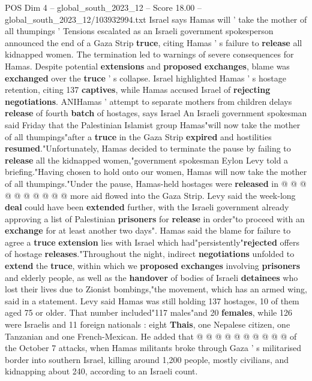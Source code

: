 \begin{textsample}{POS Dim 4 – global\_south\_2023\_12 – Score 18.00 – global\_south\_2023\_12/103932994.txt}  \label{ex:f4_pos_134}
Israel says Hamas will ' take the mother of all thumpings ' Tensions escalated as an Israeli government spokesperson announced the end of a Gaza Strip \textbf{truce}, citing Hamas ' s failure to \textbf{release} all kidnapped women.
The termination led to warnings of severe consequences for Hamas.
Despite potential \textbf{extensions} and \textbf{proposed} \textbf{exchanges}, blame was \textbf{exchanged} over the \textbf{truce} ' s collapse.
Israel highlighted Hamas ' s hostage retention, citing 137 \textbf{captives}, while Hamas accused Israel of \textbf{rejecting} \textbf{negotiations}.
ANIHamas ' attempt to separate mothers from children delays \textbf{release} of fourth \textbf{batch} of hostages, says Israel An Israeli government spokesman said Friday that the Palestinian Islamist group Hamas"will now take the mother of all thumpings"after a \textbf{truce} in the Gaza Strip \textbf{expired} and hostilities \textbf{resumed}."Unfortunately, Hamas decided to terminate the pause by failing to \textbf{release} all the kidnapped women,"government spokesman Eylon Levy told a briefing."Having chosen to hold onto our women, Hamas will now take the mother of all thumpings."Under the pause, Hamas-held hostages were \textbf{released} in @ @ @ @ @ @ @ @ @ @ more aid flowed into the Gaza Strip.
Levy said the week-long \textbf{deal} could have been \textbf{extended} further, with the Israeli government already approving a list of Palestinian \textbf{prisoners} for \textbf{release} in order"to proceed with an \textbf{exchange} for at least another two days".
Hamas said the blame for failure to agree a \textbf{truce} \textbf{extension} lies with Israel which had"persistently"\textbf{rejected} offers of hostage \textbf{releases}."Throughout the night, indirect \textbf{negotiations} unfolded to \textbf{extend} the \textbf{truce}, within which we \textbf{proposed} \textbf{exchanges} involving \textbf{prisoners} and elderly people, as well as the \textbf{handover} of bodies of Israeli \textbf{detainees} who lost their lives due to Zionist bombings,"the movement, which has an armed wing, said in a statement.
Levy said Hamas was still holding 137 hostages, 10 of them aged 75 or older.
That number included"117 males"and 20 \textbf{females}, while 126 were Israelis and 11 foreign nationals : eight \textbf{Thais}, one Nepalese citizen, one Tanzanian and one French-Mexican.
He added that @ @ @ @ @ @ @ @ @ @ of the October 7 attacks, when Hamas militants broke through Gaza ' s militarised border into southern Israel, killing around 1,200 people, mostly civilians, and kidnapping about 240, according to an Israeli count.

\end{textsample}
